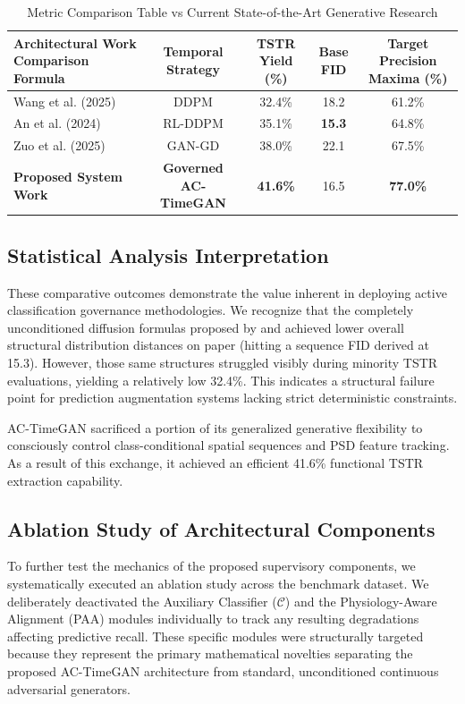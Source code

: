 \documentclass[journal,10pt,twocolumn]{IEEEtran}
\begin{document}
\begin{table}[t]
\caption{Metric Comparison Table vs Current State-of-the-Art Generative Research}
\centering
\begin{tabular}{lcccc}
\hline
\textbf{Architectural Work Comparison Formula} & \textbf{Temporal Strategy} & \textbf{TSTR Yield (\%)} & \textbf{Base FID} & \textbf{Target Precision Maxima (\%)} \\ \hline
Wang et al. (2025) \cite{10839074} & DDPM & 32.4\% & 18.2 & 61.2\% \\ \hline
An et al. (2024) \cite{an2024enhancingeegsignalgeneration} & RL-DDPM & 35.1\% & \textbf{15.3} & 64.8\% \\ \hline
Zuo et al. (2025) \cite{zuo2025high} & GAN-GD & 38.0\% & 22.1 & 67.5\% \\ \hline
\textbf{Proposed System Work} & \textbf{Governed AC-TimeGAN} & \textbf{41.6\%} & 16.5 & \textbf{77.0\%} \\ \hline
\end{tabular}
\label{tab:comparison}
\end{table}

\subsection{Statistical Analysis Interpretation}
These comparative outcomes demonstrate the value inherent in deploying active classification governance methodologies. We recognize that the completely unconditioned diffusion formulas proposed by \cite{10839074} and \cite{an2024enhancingeegsignalgeneration} achieved lower overall structural distribution distances on paper (hitting a sequence FID derived at 15.3). However, those same structures struggled visibly during minority TSTR evaluations, yielding a relatively low 32.4\%. This indicates a structural failure point for prediction augmentation systems lacking strict deterministic constraints.

AC-TimeGAN sacrificed a portion of its generalized generative flexibility to consciously control class-conditional spatial sequences and PSD feature tracking. As a result of this exchange, it achieved an efficient 41.6\% functional TSTR extraction capability.

\subsection{Ablation Study of Architectural Components}
To further test the mechanics of the proposed supervisory components, we systematically executed an ablation study across the benchmark dataset. We deliberately deactivated the Auxiliary Classifier ($\mathcal{C}$) and the Physiology-Aware Alignment (PAA) modules individually to track any resulting degradations affecting predictive recall. These specific modules were structurally targeted because they represent the primary mathematical novelties separating the proposed AC-TimeGAN architecture from standard, unconditioned continuous adversarial generators.
\end{document}

